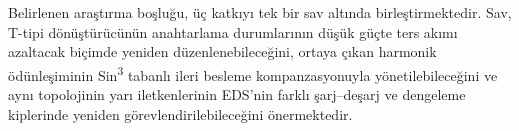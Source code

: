 Belirlenen araştırma boşluğu, üç katkıyı tek bir sav altında birleştirmektedir. Sav, T-tipi dönüştürücünün anahtarlama durumlarının düşük güçte ters akımı azaltacak biçimde yeniden düzenlenebileceğini, ortaya çıkan harmonik ödünleşiminin Sin\textsuperscript{3} tabanlı ileri besleme kompanzasyonuyla yönetilebileceğini ve aynı topolojinin yarı iletkenlerinin EDS'nin farklı şarj--deşarj ve dengeleme kiplerinde yeniden görevlendirilebileceğini önermektedir.
